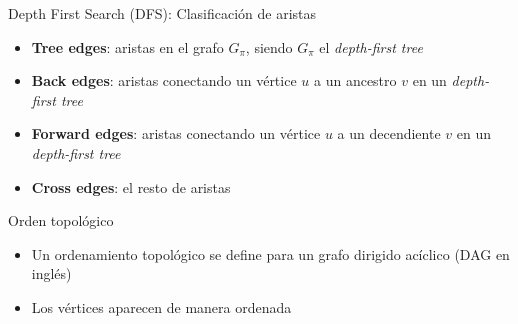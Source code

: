 \documentclass[]{beamer}
\begin{document}
\begin{frame}{Depth First Search (DFS): Clasificaci\'on de aristas}
  \begin{itemize}
    \item \textbf{Tree edges}: aristas en el grafo $G_{\pi}$, siendo $G_{\pi}$ el \textit{depth-first tree}
      \pause
    \item \textbf{Back edges}: aristas conectando un v\'ertice $u$ a un ancestro $v$ en un \textit{depth-first tree}
      \pause
    \item \textbf{Forward edges}: aristas conectando un v\'ertice $u$ a un decendiente $v$ en un \textit{depth-first tree}
      \pause
    \item \textbf{Cross edges}: el resto de aristas
  \end{itemize}
\end{frame}

\begin{frame}{Orden topol\'ogico}
  \begin{itemize}
    \item Un ordenamiento topol\'ogico se define para un grafo dirigido ac\'iclico (DAG en ingl\'es)
      \pause
    \item Los v\'ertices aparecen de manera ordenada
  \end{itemize}
\end{frame}


\end{document}

